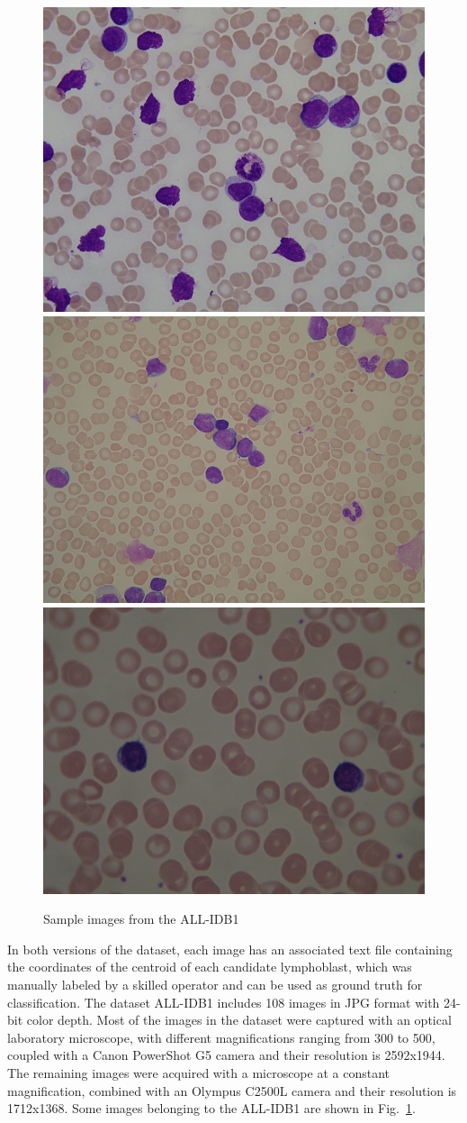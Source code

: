 \documentclass[final,a4paper,12pt,english]{UnicaPhdThesis3}
\begin{document}
\begin{figure}[!htbp]
	\centering
	\includegraphics[height=0.25\textwidth]{images/Fig17-1}
	\includegraphics[height=0.25\textwidth]{images/Fig17-2}
	\includegraphics[height=0.25\textwidth]{images/Fig17-3}
	\caption{\label{fig:dataset}Sample images from the ALL-IDB1}
\end{figure}

In both versions of the dataset, each image has an associated text file containing the coordinates of the centroid of each candidate lymphoblast, which was manually labeled by a skilled operator and can be used as ground truth for classification. The dataset ALL-IDB1 includes 108 images in JPG format with 24-bit color depth. Most of the images in the dataset were captured with an optical laboratory microscope, with different magnifications ranging from 300 to 500, coupled with a Canon PowerShot G5 camera and their resolution is 2592x1944. The remaining images were acquired with a microscope at a constant magnification, combined with an Olympus C2500L camera and their resolution is 1712x1368. Some images belonging to the ALL-IDB1 are shown in Fig.~\ref{fig:dataset}.
\end{document}
